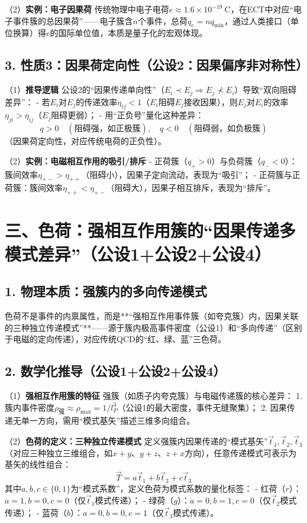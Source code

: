 \documentclass{article}
\begin{document}
（2）\textbf{实例：电子因果荷}  
传统物理中电子电荷\(e \approx 1.6 \times 10^{-19}\ \text{C}\)，在ECT中对应“电子事件簇的总因果荷”——电子簇含\(n\)个事件，总荷\(q_e = n q_{\text{min}}\)，通过人类接口（单位换算）得\(e\)的国际单位值，本质是量子化的宏观体现。

\subsection*{3. 性质3：因果荷定向性（公设2：因果偏序非对称性）}
（1）\textbf{推导逻辑}  
公设2的“因果传递单向性”（\(E_i \prec E_j \Rightarrow E_j \nprec E_i\)）导致“双向阻碍差异”：  
- 若\(E_i\)对\(E_j\)的传递效率\(\eta_{ij} < 1\)（\(E_i\)阻碍\(E_j\)接收因果），则\(E_j\)对\(E_i\)的效率\(\eta_{ji} > \eta_{ij}\)（\(E_j\)阻碍更弱）；  
- 用“正负号”量化这种差异：
\[
\boxed{q > 0 \quad (\text{阻碍强，如正极簇}),\quad q < 0 \quad (\text{阻碍弱，如负极簇})}
\]
（因果荷定向性，对应传统电荷的正负性）。

（2）\textbf{实例：电磁相互作用的吸引/排斥}  
- 正荷簇（\(q_+ > 0\)）与负荷簇（\(q_- < 0\)）：簇间效率\(\eta_{+-} > \eta_{++}\)（阻碍小），因果子定向流动，表现为“吸引”；  
- 正荷簇与正荷簇：簇间效率\(\eta_{++} < \eta_{+-}\)（阻碍大），因果子相互排斥，表现为“排斥”。


\section*{三、色荷：强相互作用簇的“因果传递多模式差异”（公设1+公设2+公设4）}

\subsection*{1. 物理本质：强簇内的多向传递模式}
色荷不是事件的内禀属性，而是**“强相互作用事件簇（如夸克簇）内，因果关联的三种独立传递模式”**——源于簇内极高事件密度（公设1）和“多向传递”（区别于电磁的定向传递），对应传统QCD的“红、绿、蓝”三色荷。

\subsection*{2. 数学化推导（公设1+公设2+公设4）}
（1）\textbf{强相互作用簇的特征}  
强簇（如质子内夸克簇）与电磁传递簇的核心差异：  
1. 簇内事件密度\(\rho_{\text{强}} \approx \rho_{\text{max}} = 1/l_P^3\)（公设1的最大密度，事件无缝聚集）；  
2. 因果传递无单一方向，需用“模式基矢”描述三维多向组合。

（2）\textbf{色荷的定义：三种独立传递模式}  
定义强簇内因果传递的“模式基矢”\(\vec{t}_1, \vec{t}_2, \vec{t}_3\)（对应三种独立三维组合，如\(x+y\)、\(y+z\)、\(z+x\)方向），任意传递模式可表示为基矢的线性组合：
\[
\boxed{\vec{T} = a \vec{t}_1 + b \vec{t}_2 + c \vec{t}_3}
\]
其中\(a,b,c \in \{0,1\}\)为“模式系数”，定义色荷为模式系数的量化标签：  
- 红荷（\(r\)）：\(a=1, b=0, c=0\)（仅\(\vec{t}_1\)模式传递）；  
- 绿荷（\(g\)）：\(a=0, b=1, c=0\)（仅\(\vec{t}_2\)模式传递）；  
- 蓝荷（\(b\)）：\(a=0, b=0, c=1\)（仅\(\vec{t}_3\)模式传递）。
\end{document}
